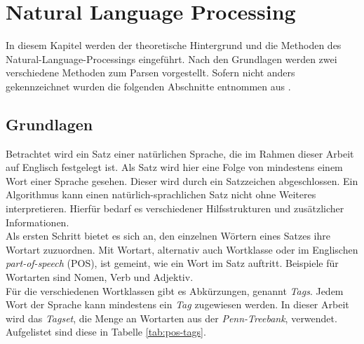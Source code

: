 %
\chapter{Natural Language Processing}
\label{sec:nlp}
In diesem Kapitel werden der theoretische Hintergrund und die Methoden des Natural-Language-Processings eingeführt. Nach den Grundlagen werden zwei verschiedene Methoden zum Parsen vorgestellt. Sofern nicht anders gekennzeichnet wurden die folgenden Abschnitte entnommen aus \cite{nlpGrundlagen}.

\section{Grundlagen}
\label{sec:nlp:grundlagen}

Betrachtet wird ein Satz einer natürlichen Sprache, die im Rahmen dieser Arbeit auf Englisch festgelegt ist. Als Satz wird hier eine Folge von mindestens einem Wort einer Sprache gesehen. Dieser wird durch ein Satzzeichen abgeschlossen.
Ein Algorithmus kann einen natürlich-sprachlichen Satz nicht ohne Weiteres interpretieren. Hierfür bedarf es verschiedener Hilfsstrukturen und zusätzlicher Informationen.\\
Als ersten Schritt bietet es sich an, den einzelnen Wörtern eines Satzes ihre Wortart zuzuordnen. Mit Wortart, alternativ auch Wortklasse oder im Englischen \textit{part-of-speech} (POS), ist gemeint, wie ein Wort im Satz auftritt. Beispiele für Wortarten sind Nomen, Verb und Adjektiv. \\
Für die verschiedenen Wortklassen gibt es Abkürzungen, genannt \textit{Tags}. Jedem Wort der Sprache kann mindestens ein \textit{Tag} zugewiesen werden. In dieser Arbeit wird das \textit{Tagset}, die Menge an Wortarten aus der \textit{Penn-Treebank}, verwendet. Aufgelistet sind diese in Tabelle \ref{tab:pos-tags}. %

